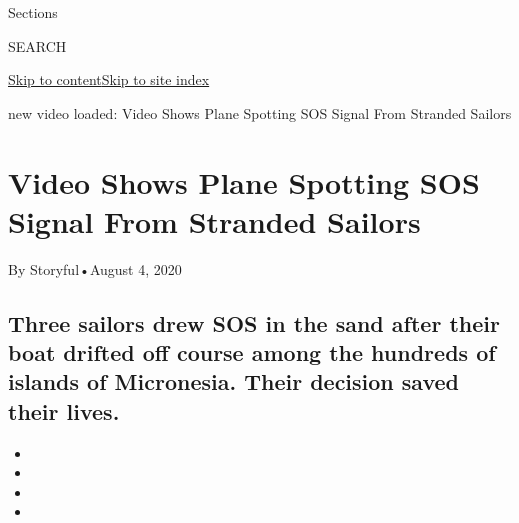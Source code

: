 Sections

SEARCH

\protect\hyperlink{site-content}{Skip to
content}\protect\hyperlink{site-index}{Skip to site index}

new video loaded: Video Shows Plane Spotting SOS Signal From Stranded
Sailors

\hypertarget{video-shows-plane-spotting-sos-signal-from-stranded-sailors}{%
\section{Video Shows Plane Spotting SOS Signal From Stranded
Sailors}\label{video-shows-plane-spotting-sos-signal-from-stranded-sailors}}

By Storyful•August 4, 2020

\hypertarget{three-sailors-drew-sos-in-the-sand-after-their-boat-drifted-off-course-among-the-hundreds-of-islands-of-micronesia-their-decision-saved-their-lives}{%
\subsection{Three sailors drew SOS in the sand after their boat drifted
off course among the hundreds of islands of Micronesia. Their decision
saved their
lives.}\label{three-sailors-drew-sos-in-the-sand-after-their-boat-drifted-off-course-among-the-hundreds-of-islands-of-micronesia-their-decision-saved-their-lives}}

\begin{itemize}
\item
\item
\item
\item
\end{itemize}

